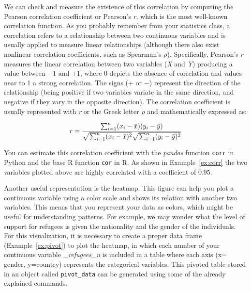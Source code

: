 We can check and measure the existence of this correlation by computing the Pearson correlation coefficient or Pearson's \emph{r}, which is the most well-known correlation function. As you probably remember from your statistics class, a correlation refers to a relationship between two continuous variables and is usually applied to measure linear relationships (although there  also exist nonlinear correlation coefficients, such as Spearman's $\rho$). Specifically, Pearson's $r$  measures the linear correlation between two variables (\emph{X} and \emph{Y}) producing a value between $-1$ and $+1$, where 0 depicts the absence of correlation and values near to 1 a strong correlation. The signs ($+$ or $-$) represent the direction of the relationship (being positive if two variables variate in the same direction, and negative if they vary in the opposite direction). The correlation coefficient is usually represented with \emph{r} or the Greek letter $\rho$ and mathematically expressed as:

$$
  r =
  \frac{ \sum_{i=1}^{n}(x_i-\bar{x})(y_i-\bar{y}) }{%
        \sqrt{\sum_{i=1}^{n}(x_i-\bar{x})^2}\sqrt{\sum_{i=1}^{n}(y_i-\bar{y})^2}}
$$

You can estimate this correlation coefficient with the \emph{pandas} function \texttt{corr} in Python and the base R function \texttt{cor} in R. As shown in Example~\ref{ex:corr} the two variables plotted above are highly correlated with a coefficient of 0.95.


Another useful representation is the heatmap. This figure can help you plot a continuous variable using a color scale and shows its relation with another two variables.  This means that you represent your data as colors, which might be useful for understanding patterns. For example, we may wonder what  the level of support for refugees is given the nationality and the gender of the individuals. For this visualization, it is necessary to create a proper data frame (Example~\ref{ex:pivot}) to plot the heatmap, in which each number of your continuous variable \emph{\_refugees\_n} is included in a table where each axis (x= gender, y=country) represents the categorical variables. This pivoted table stored in an object called \texttt{pivot\_data} can be generated using some of the already explained commands.


